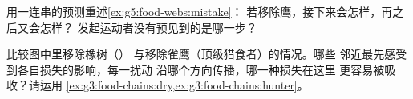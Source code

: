 \begin{exercise}[$\star\star$]\label{exo:g5:food-webs:10}
用一连串的预测重述\cref{ex:g5:food-webs:mistake}：
若移除鹰，接下来会怎样，再之后又会怎样？
发起运动者没有预见到的是哪一步？
\end{exercise}

\begin{exercise}[$\star\star\star$]\label{exo:g5:food-webs:11}
比较图中里移除橡树（）
与移除雀鹰（顶级猎食者）的情况。哪些
邻近最先感受到各自损失的影响，每一扰动
沿哪个方向传播，哪一种损失在这里
更容易被吸收？请运用
\cref{ex:g3:food-chains:dry,ex:g3:food-chains:hunter}。
\end{exercise}
